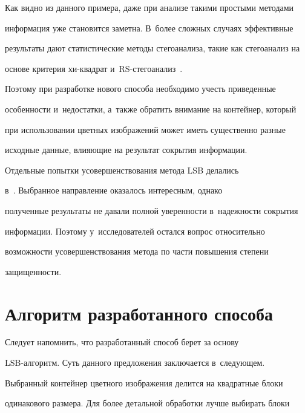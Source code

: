   


  Как видно из данного примера, даже при анализе такими простыми методами 


информация уже становится заметна. В~более сложных случаях эффективные 


результаты дают статистические методы стегоанализа, такие как стегоанализ на 


основе критерия хи-квад\-рат и~RS-сте\-го\-ана\-лиз~\cite{4-lin, 5-lin}.




  Поэтому при разработке нового способа необходимо учесть приведенные 


особенности и~недостатки, а~также обратить внимание на контейнер, который 


при использовании цветных изображений может иметь существенно разные 


исходные данные, влияющие на результат сокрытия информации.


  


  Отдельные попытки усовершенствования метода LSB делались  


в~\cite{11-lin, 12-lin}. Выбранное направление оказалось интересным, однако 


полученные результаты не давали полной уверенности в~надежности сокрытия 


информации. Поэтому у~исследователей остался вопрос относительно 


возможности усовершенствования метода по части повышения степени 


защищенности.


  


  \section{Алгоритм разработанного способа  }


  


  Следует напомнить, что разработанный способ берет за основу  


LSB-ал\-го\-ритм. Суть данного предложения заключается в~следующем.


  


  Выбранный контейнер цветного изображения делится на квадратные блоки 


одинакового размера. Для более детальной обработки лучше выбирать блоки 


